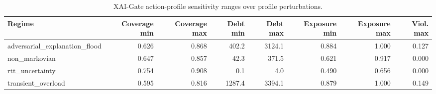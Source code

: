 \begin{table}[t]
\caption{XAI-Gate action-profile sensitivity ranges over profile perturbations.}
\label{tab:profile_sensitivity_ranges}
\centering
\scriptsize
\begin{tabular}{@{}lrrrrrrr@{}}
\toprule
Regime & Coverage min & Coverage max & Debt min & Debt max & Exposure min & Exposure max & Viol. max \\
\midrule
adversarial\_explanation\_flood & 0.626 & 0.868 & 402.2 & 3124.1 & 0.884 & 1.000 & 0.127 \\
non\_markovian & 0.647 & 0.857 & 42.3 & 371.5 & 0.621 & 0.917 & 0.000 \\
rtt\_uncertainty & 0.754 & 0.908 & 0.1 & 4.0 & 0.490 & 0.656 & 0.000 \\
transient\_overload & 0.595 & 0.816 & 1287.4 & 3394.1 & 0.879 & 1.000 & 0.149 \\
\bottomrule
\end{tabular}
\end{table}
